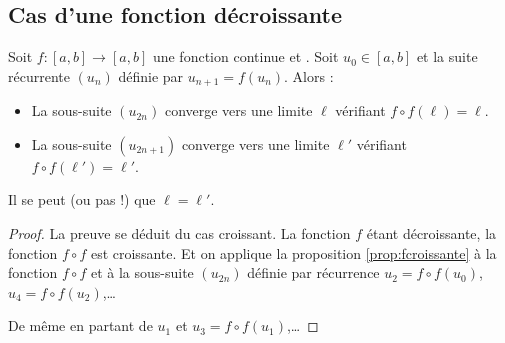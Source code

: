 \documentclass[class=report,crop=false]{standalone}
\begin{document}
\subsection{Cas d'une fonction décroissante}



\begin{proposition}
Soit $f : [a,b] \to [a,b]$ une fonction continue et .
Soit $u_0 \in [a,b]$ et la suite récurrente $(u_n)$ définie par $u_{n+1}=f(u_n)$. Alors :
\begin{itemize}
  \item La sous-suite $(u_{2n})$ converge vers une limite $\ell$  vérifiant $f\circ f(\ell)=\ell$.
  \item La sous-suite $(u_{2n+1})$ converge vers une limite $\ell'$ vérifiant $f\circ f(\ell')=\ell'$.
\end{itemize}
\end{proposition}


Il se peut (ou pas !) que $\ell=\ell'$.

\begin{proof}
La preuve se déduit du cas croissant.
La fonction $f$ étant décroissante, la fonction $f\circ f$ est croissante.
Et on applique la proposition \ref{prop:fcroissante} à la fonction $f\circ f$ et
à la sous-suite $(u_{2n})$ définie par récurrence $u_2 = f\circ f(u_0)$, $u_4 = f\circ f(u_2)$,\ldots

De même en partant de $u_1$ et $u_3 = f \circ f(u_1)$,\ldots
\end{proof}
\end{document}
